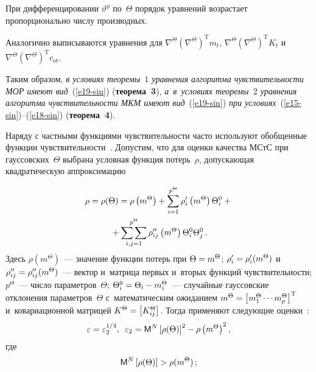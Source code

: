 \begin{multicols}{2}
При дифференцировании $\vartheta^y$ по~$\Theta$ порядок уравнений
возрастает пропорционально числу производных.

Аналогично выписываются уравнения для $\nabla^\Theta (\nabla^\Theta )^{\mathrm{T}} m_t$,
$\nabla^\Theta (\nabla^\Theta )^{\mathrm{T}} K_t$ 
и~$\nabla^\Theta (\nabla^\Theta )^{\mathrm{T}} c_{\nu t}$.


Таким образом, \textit{в условиях теоремы~$1$ уравнения алгоритма чувствительности
МОР имеют вид}~(\ref{e19-sin}) (\textbf{теорема~3}),
\textit{а~в~условиях теоремы~$2$ уравнения алгоритма чувствительности
МКМ имеют вид}~(\ref{e19-sin}) \textit{при условиях}~(\ref{e15-sin})--(\ref{e18-sin})
(\textbf{теорема~4}).

\smallskip

Наряду с частными функциями чувствитель\-ности часто используют
обобщенные функции чувствительности~\cite{17-sin, 18-sin}.
Допустим, что для оценки качества МСтС при гауссовских~$\Theta$ выбрана
условная функция потерь~$\rho$, допускающая квадратическую аппроксимацию

\vspace*{-3pt}

\noindent
\begin{multline*}
    \rho = \rho(\Theta) = \rho \left(m^\Theta\right) +
    \sss_{i=1}^{p^\Theta} \rho_i' \left(m^\Theta\right) \Theta_i^0 +{}\\
    {}+
    \ss2_{i, j =1}^{p^\Theta} \rho_{ij}'' \left(m^\Theta \right)
    \Theta_i^0\Theta_j^0\,.
    \end{multline*}
Здесь $\rho(m^\Theta)$~--- значение функции потерь при $\Theta\hm=
m^\Theta$; $ \rho_i' \hm=\rho_i' (m^\Theta)$  и~$\rho_{ij}'' \hm=
\rho_{ij}'' (m^\Theta)$~--- вектор и~матрица первых и~вторых функций
чувст\-ви\-тель\-ности; $p^\Theta$~--- число параметров~$\Theta$;
$\Theta_i^0 \hm=\Theta_i \hm- m_i^\Theta$~--- случайные гауссовские
отклонения  параметров~$\Theta$ с~математическим ожиданием $m^\Theta
\hm= \lk m_1^\Theta \cdots m_{p}^\Theta\rk^{\mathrm{T}}$ и~ковариационной матрицей
$K^\Theta \hm= \lk K_{ij}^\Theta\rk$. Тогда применяют следующие оценки~\cite{17-sin, 18-sin}:
\begin{equation}
    \varepsilon = \varepsilon_2^{1/4},\enskip
    \varepsilon_2 ={\sf M}^N \left[ \rho (\Theta)\right]^2 - \rho
    \left(m^\Theta\right)^2,\label{e21-sin}
    \end{equation}
где
\begin{equation}
{\sf M}^N \left[ \rho(\Theta)\right] > \rho (m^\Theta)\,;\label{e22-sin}
\end{equation}


\end{multicols}
